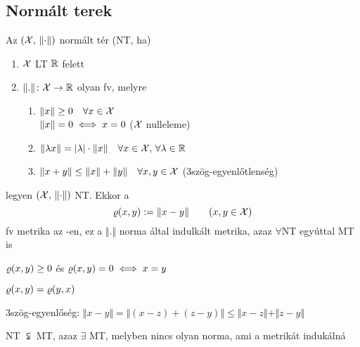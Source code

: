 \subsection{Normált terek}
\begin{de}
  Az $(\mathcal{X},\,\left\Vert \cdot\right\Vert)$ normált tér (NT, ha)
  \begin{enumerate}
  \item $\mathcal{X}$ LT $\mathbb{R}$ felett
  \item $\Vert.\Vert\colon \mathcal{X}\to\mathbb{R}$ olyan fv, melyre
    \begin{enumerate}
    \item $\Vert x \Vert \geq 0\quad \forall x\in\mathcal{X}$\\
      $\Vert x \Vert = 0 \iff x = 0$ ($\mathcal{X}$ nulleleme)
    \item $\Vert\lambda x\Vert = \vert\lambda\vert\cdot \Vert
      x\Vert\quad \forall x\in \mathcal{X},\,\forall \lambda\in\mathbb{R}$
    \item $\Vert x+y\Vert\leq\Vert x\Vert+\Vert y\Vert \quad
      \forall x,y\in \mathcal{X}$ (3szög-egyenlőtlenség)
    \end{enumerate}
  \end{enumerate}
\end{de}
\begin{te}
  legyen $(\mathcal{X},\,\left\Vert \cdot\right\Vert)$ NT. Ekkor a 
  \[\varrho(x,y) := \Vert x - y \Vert\qquad (x,y\in \mathcal{X})\]
  fv metrika az \X-en, ez a $\Vert.\Vert$ norma által indulkált
  metrika,
  azaz $\forall$NT egyúttal MT is
\end{te}
\newpage                                 %
\begin{Biz}
\item $\varrho(x,y) \geq 0$ és $\varrho(x,y)=0 \iff x = y$
\item $\varrho(x,y) = \varrho(y,x)$
\item 3szög-egyenlőség: $\Vert x-y\Vert = \Vert( x-z ) + ( z-y)\Vert
  \leq \Vert x-z \Vert + \Vert z-y\Vert$
\end{Biz}

\begin{megj} NT $\subsetneqq$ MT, azaz $\exists$ MT, melyben nincs
  olyan norma, ami a metrikát indukálná
\end{megj}

